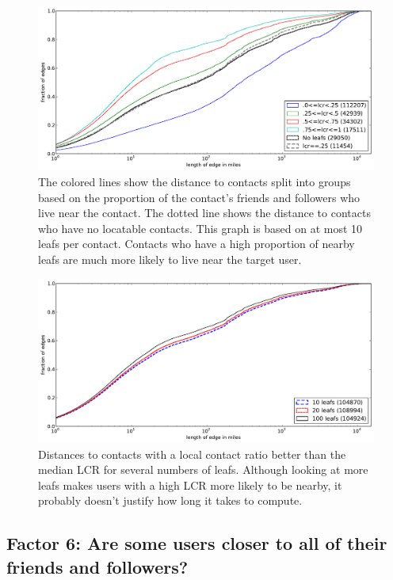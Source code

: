 \documentclass[letterpaper]{article}
\begin{document}
\begin{figure}[tbh]
\centering
\includegraphics[width=.9\linewidth]{figures/locals_10.pdf}
\caption{
The colored lines show the distance to contacts split into groups based on the
proportion of the contact's friends and followers who live near the contact.
The dotted line shows the distance to contacts who have no locatable contacts.
This graph is based on at most 10 leafs per contact.
Contacts who have a high proportion of nearby leafs are much more likely to
live near the target user.
}
\label{fig:Local10}
\end{figure}

\begin{figure}[tbh]
\centering
\includegraphics[width=.9\linewidth]{figures/locals_cmp.pdf}
\caption{
    Distances to contacts with a local contact ratio better than the median LCR
    for several numbers of leafs.
    Although looking at more leafs makes users with a high LCR more likely to
    be nearby, it probably doesn't justify how long it takes to compute.
}
\label{fig:LocalCmp}
\end{figure}

\subsection{Factor 6: Are some users closer to all of their friends and followers?}
\label{sec:closer}
\end{document}
